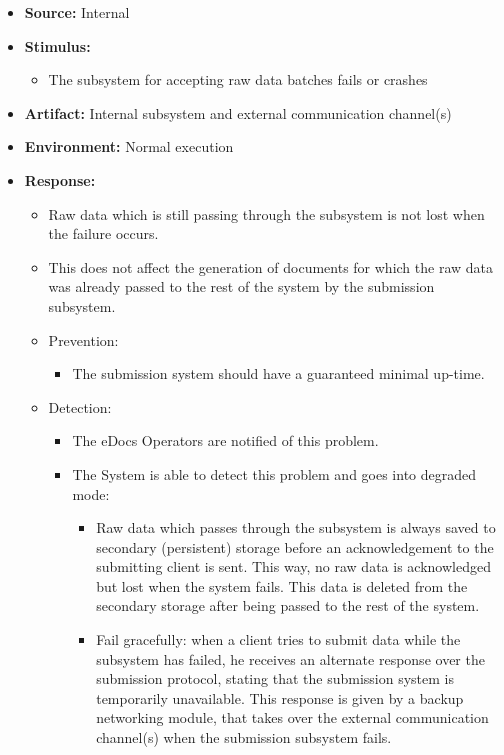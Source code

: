 \documentclass[a4paper,10pt]{article}
\begin{document}
\begin{itemize}
    \item \textbf{Source:} Internal
    \item \textbf{Stimulus:}
        \begin{itemize}
            \item The subsystem for accepting raw data batches fails or crashes
        \end{itemize}

    \item \textbf{Artifact:} Internal subsystem and external communication channel(s)
    \item \textbf{Environment:} Normal execution
    \item \textbf{Response:}
        \begin{itemize}
            \item Raw data which is still passing through the subsystem is not lost when the failure occurs.
            \item This does not affect the generation of documents for which the raw data was already passed to the rest of the system by the submission subsystem.
            \item Prevention:
            \begin{itemize}
                \item The submission system should have a guaranteed minimal up-time.
            \end{itemize}
            \item Detection:
            \begin{itemize}
                \item The eDocs Operators are notified of this problem.
                \item The System is able to detect this problem and goes into degraded mode:
                \begin{itemize}
                    \item Raw data which passes through the subsystem is always saved to secondary (persistent) storage before an acknowledgement to the submitting client is sent. This way, no raw data is acknowledged but lost when the system fails. This data is deleted from the secondary storage after being passed to the rest of the system.
                    \item Fail gracefully: when a client tries to submit data while the subsystem has failed, he receives an alternate response over the submission protocol, stating that the submission system is temporarily unavailable. This response is given by a backup networking module, that takes over the external communication channel(s) when the submission subsystem fails.

\end{itemize}
\end{itemize}
\end{itemize}
\end{itemize}
\end{document}

